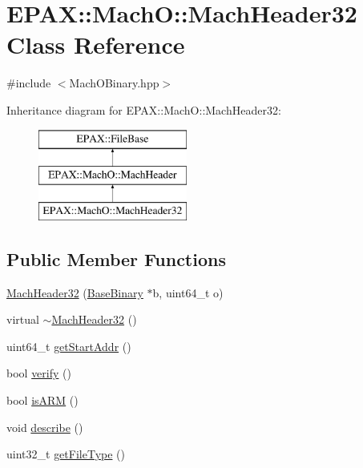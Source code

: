\hypertarget{class_e_p_a_x_1_1_mach_o_1_1_mach_header32}{\section{\-E\-P\-A\-X\-:\-:\-Mach\-O\-:\-:\-Mach\-Header32 \-Class \-Reference}
\label{class_e_p_a_x_1_1_mach_o_1_1_mach_header32}
}


{\ttfamily \#include $<$\-Mach\-O\-Binary.\-hpp$>$}

\-Inheritance diagram for \-E\-P\-A\-X\-:\-:\-Mach\-O\-:\-:\-Mach\-Header32\-:\begin{figure}[H]
\begin{center}
\leavevmode
\includegraphics[height=3.000000cm]{class_e_p_a_x_1_1_mach_o_1_1_mach_header32}
\end{center}
\end{figure}
\subsection*{\-Public \-Member \-Functions}
\begin{DoxyCompactItemize}
\item 
\hyperlink{class_e_p_a_x_1_1_mach_o_1_1_mach_header32_a0878662183d5daaaca7398558c5aaf1b}{\-Mach\-Header32} (\hyperlink{class_e_p_a_x_1_1_base_binary}{\-Base\-Binary} $\ast$b, uint64\-\_\-t o)
\item 
virtual \hyperlink{class_e_p_a_x_1_1_mach_o_1_1_mach_header32_abf3abb3d4e236a8020adcaa9dfc840db}{$\sim$\-Mach\-Header32} ()
\item 
uint64\-\_\-t \hyperlink{class_e_p_a_x_1_1_mach_o_1_1_mach_header32_a4f0786ea334b1aae005caa3ea74231bb}{get\-Start\-Addr} ()
\item 
bool \hyperlink{class_e_p_a_x_1_1_mach_o_1_1_mach_header32_ab11fe95e26ef0b3f3eeabf4d9206d6b9}{verify} ()
\item 
bool \hyperlink{class_e_p_a_x_1_1_mach_o_1_1_mach_header32_a48f089963011dc2a1f04ca445445a29f}{is\-A\-R\-M} ()
\item 
void \hyperlink{class_e_p_a_x_1_1_mach_o_1_1_mach_header32_a4870b0179039c78eb507d2c63e818153}{describe} ()
\item 
uint32\-\_\-t \hyperlink{class_e_p_a_x_1_1_mach_o_1_1_mach_header32_a8b45baa84c71a8d1444d801df54c703e}{get\-File\-Type} ()
\end{DoxyCompactItemize}



